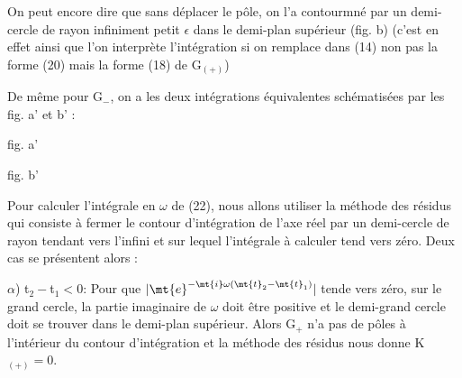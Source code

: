 On peut encore dire que sans déplacer le pôle, on l'a contourmné par
un demi-cercle de rayon infiniment petit $\epsilon$ dans le demi-plan supérieur
(fig. b) (c'est en effet ainsi que l'on interprète l'intégration si on
remplace dans (14) non pas la forme (20) mais la forme (18) de G$_{(+)}$)

De même pour G$_-$, on a les deux intégrations équivalentes schématisées par les fig. a' et b' :

\vspace{0.3cm}
\begin{minipage}[c]{.45\linewidth}
\begin{center} 

fig. a'
\end{center}
\end{minipage}
\hfill
\begin{minipage}[c]{.45\linewidth}
\begin{center} 

fig. b'
\end{center}
\end{minipage}
\vspace{0.3cm}

Pour calculer l'intégrale en $\omega$ de (22), nous allons utiliser la méthode
des résidus qui consiste à fermer le contour d'intégration de l'axe réel
par un demi-cercle de rayon tendant vers l'infini et sur lequel l'intégrale
à calculer tend vers zéro. Deux cas se présentent alors :

$\alpha$) t$_2-$t$_1<0$: Pour que $|\mt{e}^{-\mt{i}\omega(\mt{t}_2-\mt{t}_1)}|$ tende vers zéro, sur le grand
cercle, la partie imaginaire de $\omega$ doit être positive et le demi-grand
cercle doit se trouver dans le demi-plan supérieur. Alors G$_+$ n'a pas de
pôles à l'intérieur du contour d'intégration et la méthode des résidus
nous donne K$_{(+)}=0$.

